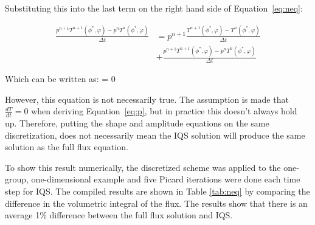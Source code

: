 Substituting this into the last term on the right hand side of Equation~\ref{eq:neq}:

\begin{align}
\frac{p^{n+1}T^{n+1}(\phi^{*},\varphi)-p^nT^{n}(\phi^{*},\varphi)}{\Delta t} &= p^{n+1}\frac{T^{n+1}(\phi^{*},\varphi)-T^{n}(\phi^{*},\varphi)}{\Delta t} \nonumber \\
&+ \frac{p^{n+1}T^{n+1}(\phi^{*},\varphi)-p^nT^{n}(\phi^{*},\varphi)}{\Delta t}
\label{eq:neq2}
\end{align}

Which can be written as:
\be
{} = 0
\ee

 However, this equation is not necessarily true.  The assumption is made that $\frac{dT}{dt} = 0$ when deriving Equation~\ref{eq:p}, but in practice this doesn't always hold up. Therefore, putting the shape and amplitude equations on the same discretization, does not necessarily mean the IQS solution will produce the same solution as the full flux equation.
 
To show this result numerically, the discretized scheme was applied to the one-group, one-dimensional example and five Picard iterations were done each time step for IQS.  The compiled results are shown in Table \ref{tab:neq} by comparing the difference in the volumetric integral of the flux. The results show that there is an average 1\% difference between the full flux solution and IQS.


